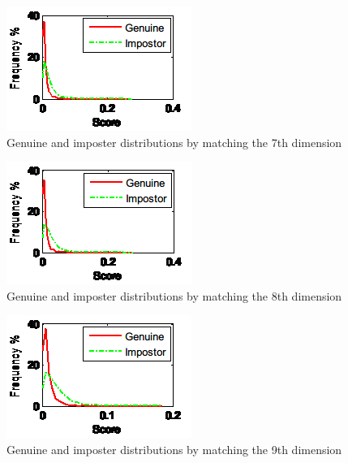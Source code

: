 \begin{figure}[htb]
  \begin{center}
    \includegraphics[scale=1]{ch-experiment/figures/11g}
    \caption{Genuine and imposter distributions by matching the 7th dimension}
    \label{fig:experiment:11g}
  \end{center}
\end{figure}

\begin{figure}[htb]
  \begin{center}
    \includegraphics[scale=1]{ch-experiment/figures/11h}
    \caption{Genuine and imposter distributions by matching the 8th dimension}
    \label{fig:experiment:11h}
  \end{center}
\end{figure}

\begin{figure}[htb]
  \begin{center}
    \includegraphics[scale=1]{ch-experiment/figures/11i}
    \caption{Genuine and imposter distributions by matching the 9th dimension}
    \label{fig:experiment:11i}
  \end{center}
\end{figure}

